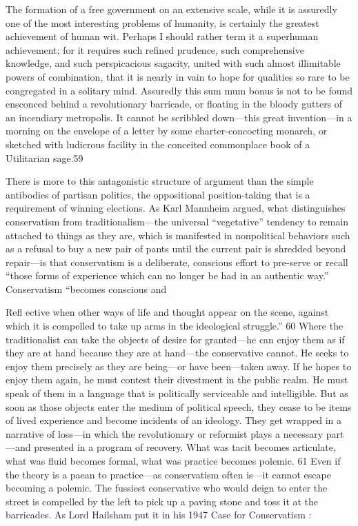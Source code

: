  \par 
The formation of a free government on an extensive scale, while it is assuredly one of the most interesting problems of humanity, is certainly the greatest achievement of human wit. Perhaps I should rather term it a superhuman achievement; for it requires such refined prudence, such comprehensive knowledge, and such perspicacious sagacity, united with such almost illimitable powers of combination, that it is nearly in vain to hope for qualities so rare to be congregated in a solitary mind. Assuredly this sum mum bonus is not to be found ensconced behind a revolutionary barricade, or floating in the bloody gutters of an incendiary metropolis. It cannot be scribbled down—this great invention—in a morning on the envelope of a letter by some charter-concocting monarch, or sketched with ludicrous facility in the conceited commonplace book of a Utilitarian sage.{\color{blue}59}
 \par 
There is more to this antagonistic structure of argument than the simple antibodies of partisan politics, the oppositional position-taking that is a requirement of winning elections. As Karl Mannheim argued, what distinguishes conservatism from traditionalism—the universal “vegetative” tendency to remain attached to things as they are, which is manifested in nonpolitical behaviors such as a refusal to buy a new pair of pants until the current pair is shredded beyond repair—is that conservatism is a deliberate, conscious effort to pre-serve or recall “those forms of experience which can no longer be had in an authentic way.” Conservatism “becomes conscious and
 \par 
Refl ective when other ways of life and thought appear on the scene, against which it is compelled to take up arms in the ideological struggle.” {\color{blue}60} Where the traditionalist can take the objects of desire for granted—he can enjoy them as if they are at hand because they are at hand—the conservative cannot. He seeks to enjoy them precisely as they are being—or have been—taken away. If he hopes to enjoy them again, he must contest their divestment in the public realm. He must speak of them in a language that is politically serviceable and intelligible. But as soon as those objects enter the medium of political speech, they cease to be items of lived experience and become incidents of an ideology. They get wrapped in a narrative of loss—in which the revolutionary or reformist plays a necessary part—and presented in a program of recovery. What was tacit becomes articulate, what was fluid becomes formal, what was practice becomes polemic. {\color{blue}61} Even if the theory is a paean to practice—as conservatism often is—it cannot escape becoming a polemic. The fussiest conservative who would deign to enter the street is compelled by the left to pick up a paving stone and toss it at the barricades. As Lord Hailsham put it in his 1947 Case for Conservatism :
